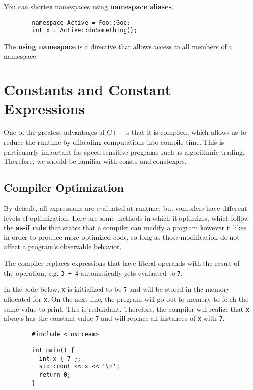 \documentclass{article}
\begin{document}
    \begin{lemma}
      You can shorten namespaces using \textbf{namespace aliases}. 
      \begin{lstlisting}
        namespace Active = Foo::Goo; 
        int x = Active::doSomething(); 
      \end{lstlisting}
    \end{lemma}

    \begin{lemma}
      The \textbf{using namespace} is a directive that allows access to all members of a namespace. 
    \end{lemma}

\section{Constants and Constant Expressions}

    One of the greatest advantages of C++ is that it is compiled, which allows us to reduce the runtime by offloading computations into compile time. This is particularly important for speed-sensitive programs such as algorithmic trading. Therefore, we should be familiar with consts and constexprs. 

  \subsection{Compiler Optimization} 

    By default, all expressions are evaluated at runtime, but compilers have different levels of optimization. Here are some methods in which it optimizes, which follow the \textbf{as-if rule} that states that a compiler can modify a program however it likes in order to produce more optimized code, so long as those modification do not affect a program's observable behavior. 

    \begin{definition} 
      The compiler replaces expressions that have literal operands with the result of the operation, e.g. \texttt{3 + 4} automatically gets evaluated to \texttt{7}. 
    \end{definition}

    \begin{definition}
      In the code below, \texttt{x} is initialized to be \texttt{7} and will be stored in the memory allocated for \texttt{x}. On the next line, the program will go out to memory to fetch the same value to print. This is redundant. Therefore, the compiler will realize that \texttt{x} always has the constant value \texttt{7} and will replace all instances of \texttt{x} with \texttt{7}. 
      \begin{lstlisting}
        #include <iostream>

        int main() {
          int x { 7 };
          std::cout << x << '\n';
          return 0;
        } 
      \end{lstlisting}
    \end{definition}
\end{document}
